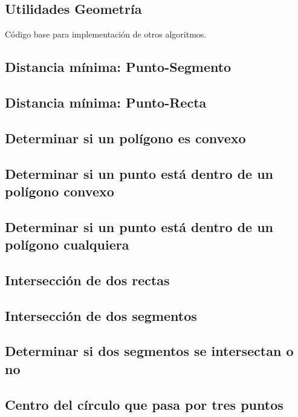 \documentclass[10pt,letterpaper,twocolumn,twosided]{article}
\newcommand{\codigofuente}[1]{

\dotfill
}
\begin{document}
\subsection{Utilidades Geometría}
Código base para implementación de otros algoritmos.
\codigofuente{../src/geom/utilities.${EXT}} %

\subsection{Distancia mínima: Punto-Segmento}

\subsection{Distancia mínima: Punto-Recta}

\subsection{Determinar si un polígono es convexo}

\subsection{Determinar si un punto está dentro de un polígono convexo}

\subsection{Determinar si un punto está dentro de un polígono cualquiera}

\subsection{Intersección de dos rectas}

\subsection{Intersección de dos segmentos}

\subsection{Determinar si dos segmentos se intersectan o no}

\subsection{Centro del círculo que pasa por tres puntos}
\end{document}
